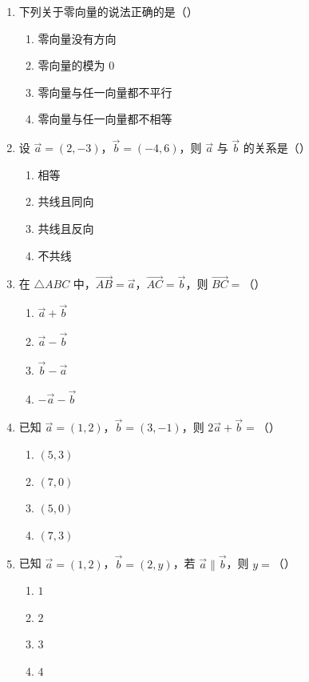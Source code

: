 \documentclass[12pt, a4paper]{ctexart}
\begin{document}
\begin{enumerate}
\item 下列关于零向量的说法正确的是（\quad）
  \begin{enumerate}[label=\Alph*., itemsep=0pt]
    \item 零向量没有方向 \quad \item 零向量的模为 $0$
    \item 零向量与任一向量都不平行 \quad \item 零向量与任一向量都不相等
  \end{enumerate}

\item 设 $\vec{a}=(2,-3)$，$\vec{b}=(-4,6)$，则 $\vec{a}$ 与 $\vec{b}$ 的关系是（\quad）
  \begin{enumerate}[label=\Alph*., itemsep=0pt]
    \item 相等 \quad \item 共线且同向 \quad \item 共线且反向 \quad \item 不共线
  \end{enumerate}

\item 在 $\triangle ABC$ 中，$\overrightarrow{AB}=\vec{a}$，$\overrightarrow{AC}=\vec{b}$，则 $\overrightarrow{BC}=$（\quad）
  \begin{enumerate}[label=\Alph*., itemsep=0pt]
    \item $\vec{a}+\vec{b}$ \quad \item $\vec{a}-\vec{b}$ \quad \item $\vec{b}-\vec{a}$ \quad \item $-\vec{a}-\vec{b}$
  \end{enumerate}

\item 已知 $\vec{a}=(1,2)$，$\vec{b}=(3,-1)$，则 $2\vec{a}+\vec{b}=$（\quad）
  \begin{enumerate}[label=\Alph*., itemsep=0pt]
    \item $(5,3)$ \quad \item $(7,0)$ \quad \item $(5,0)$ \quad \item $(7,3)$
  \end{enumerate}

\item 已知 $\vec{a}=(1,2)$，$\vec{b}=(2,y)$，若 $\vec{a}\parallel\vec{b}$，则 $y=$（\quad）
  \begin{enumerate}[label=\Alph*., itemsep=0pt]
    \item $1$ \quad \item $2$ \quad \item $3$ \quad \item $4$
  \end{enumerate}


\end{enumerate}
\end{document}
